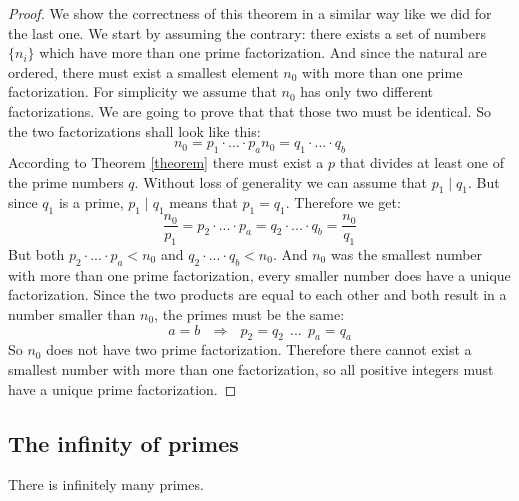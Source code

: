 \documentclass{article}
\theoremstyle{definition}
\begin{document}
\begin{proof}
    We show the correctness of this theorem in a similar way like we did for the last one. We start by assuming the contrary: there exists a set of numbers $\{ n_i\}$ which have more than one prime factorization. And since the natural are ordered, there must exist a smallest element $n_0$ with more than one prime factorization. For simplicity we assume that $n_0$ has only two different factorizations. We are going to prove that that those two must be identical. So the two factorizations shall look like this:
    \begin{equation}
        n_0 = p_1 \cdot ... \cdot p_a
        n_0 = q_1 \cdot ... \cdot q_b
    \end{equation}
    According to Theorem \ref{theorem} there must exist a $p$ that divides at least one of the prime numbers $q$. Without loss of generality we can assume that $p_1 \mid q_1$. But since $q_1$ is a prime, $p_1 \mid q_1$ means that $p_1 = q_1$. Therefore we get:
    \begin{equation}
        \frac{n_0}{p_1} = p_2 \cdot ... \cdot p_a = q_2 \cdot ... \cdot q_b = \frac{n_0}{q_1}
    \end{equation}
    But both  $p_2 \cdot ... \cdot p_a < n_0 $ and $q_2 \cdot ... \cdot q_b < n_0$. And $n_0$ was the smallest number with more than one prime factorization, every smaller number does have a unique factorization. Since the two products are equal to each other and both result in a number smaller than $n_0$, the primes must be the same:
    \begin{equation}
        a = b \: \: \:  \Rightarrow \: \: \: p_2 = q_2 \: \: . . . \: \: p_a = q_a
    \end{equation}
    So $n_0$ does not have two prime factorization. Therefore there cannot exist a smallest number with more than one factorization, so all positive integers must have a unique prime factorization.
\end{proof}

\subsection{The infinity of primes}
\begin{theorem}
    There is infinitely many primes.
\end{theorem}
\end{document}
